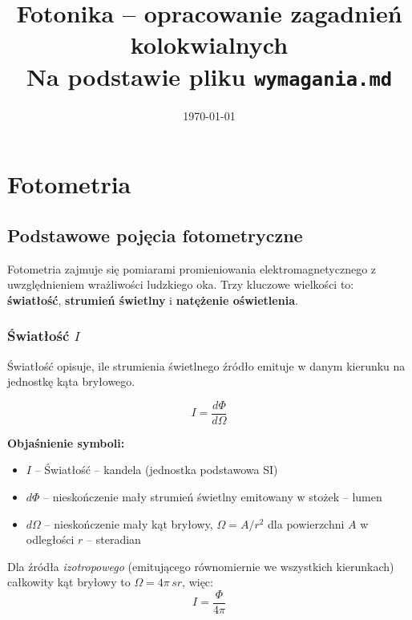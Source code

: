 \documentclass[12pt,a4paper]{article}
\title{\textbf{Fotonika -- opracowanie zagadnień kolokwialnych}\\[4pt]
       \large Na podstawie pliku \texttt{wymagania.md}}
\author{}
\date{\today}
\newcommand{\oznaczenie}[2]{%
  \item $#1$ -- #2%
}
\begin{document}
\maketitle
\tableofcontents
\newpage

\section{Fotometria}

\subsection{Podstawowe pojęcia fotometryczne}

Fotometria zajmuje się pomiarami promieniowania elektromagnetycznego z uwzględnieniem
wrażliwości ludzkiego oka.  Trzy kluczowe wielkości to:
\textbf{światłość}, \textbf{strumień świetlny} i \textbf{natężenie oświetlenia}.

\subsubsection{Światłość $I$}

Światłość opisuje, ile strumienia świetlnego źródło emituje w danym kierunku
na jednostkę kąta bryłowego.

\begin{wzorbox}
\begin{equation}
  I = \frac{d\Phi}{d\Omega}
  \label{eq:swiatlosc}
\end{equation}
\end{wzorbox}

\begin{objasnbox}
\textbf{Objaśnienie symboli:}
\begin{itemize}[leftmargin=2em]
  \oznaczenie{I}{Światłość \quad [\textbf{cd}] -- kandela (jednostka podstawowa SI)}
  \oznaczenie{d\Phi}{nieskończenie mały strumień świetlny emitowany w stożek
                    \quad [\textbf{lm}] -- lumen}
  \oznaczenie{d\Omega}{nieskończenie mały kąt bryłowy,
                    $\Omega = A/r^2$ dla powierzchni $A$ w odległości $r$
                    \quad [\textbf{sr}] -- steradian}
\end{itemize}
\end{objasnbox}

Dla źródła \emph{izotropowego} (emitującego równomiernie we wszystkich kierunkach)
całkowity kąt bryłowy to $\Omega = 4\pi\,\si{sr}$, więc:
\begin{equation}
  I = \frac{\Phi}{4\pi}
  \label{eq:swiatlosc_izotropowe}
\end{equation}
\end{document}
